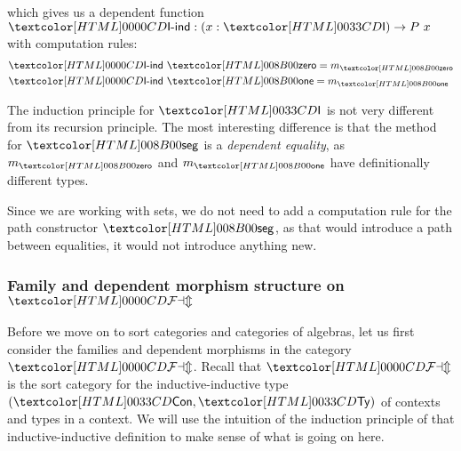 which gives us a dependent function $\intind : (x : \intty) \to P\ x$
with computation rules:
\begin{align*}
  &\intind\ \intzero = m_{\intzero} \\
  &\intind\ \intone = m_{\intone} \\
\end{align*}

The induction principle for $\intty$ is not very different from its
recursion principle. The most interesting difference is that the
method for $\intseg$ is a \emph{dependent equality}, as $m_{\intzero}$
and $m_{\intone}$ have definitionally different types.

Since we are working with sets, we do not need to add a computation
rule for the path constructor $\intseg$, as that would introduce a
path between equalities, \ie it would not introduce anything new.

\subsubsection{Family and dependent morphism structure on $\FAM$}

Before we move on to sort categories and categories of algebras, let
us first consider the families and dependent morphisms in the category
$\FAM$. Recall that $\FAM$ is the sort category for the
inductive-inductive type $(\ttconty,\tttyty)$ of contexts and types in
a context. We will use the intuition of the induction principle of
that inductive-inductive definition to make sense of what is going on
here.


